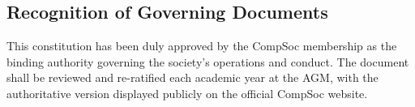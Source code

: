 \subsection{Recognition of Governing Documents}
This constitution has been duly approved by the CompSoc membership as the binding authority governing the society's operations and conduct. The document shall be reviewed and re-ratified each academic year at the AGM, with the authoritative version displayed publicly on the official CompSoc website.